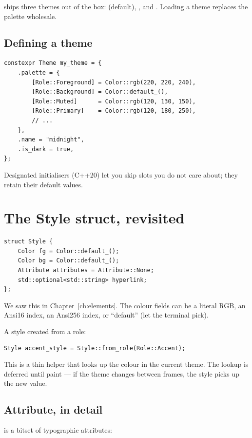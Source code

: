 \maya{} ships three themes out of the box:  (default),
, and . Loading a theme replaces
the palette wholesale.

\subsection*{Defining a theme}

\begin{lstlisting}
constexpr Theme my_theme = {
    .palette = {
        [Role::Foreground] = Color::rgb(220, 220, 240),
        [Role::Background] = Color::default_(),
        [Role::Muted]      = Color::rgb(120, 130, 150),
        [Role::Primary]    = Color::rgb(120, 180, 250),
        // ...
    },
    .name = "midnight",
    .is_dark = true,
};
\end{lstlisting}

Designated initialisers (C++20) let you skip slots you do not
care about; they retain their default values.

\section{The Style struct, revisited}

\begin{lstlisting}
struct Style {
    Color fg = Color::default_();
    Color bg = Color::default_();
    Attribute attributes = Attribute::None;
    std::optional<std::string> hyperlink;
};
\end{lstlisting}

We saw this in Chapter~\ref{ch:elements}. The colour fields can
be a literal RGB, an Ansi16 index, an Ansi256 index, or
``default'' (let the terminal pick).

A style created from a role:

\begin{lstlisting}
Style accent_style = Style::from_role(Role::Accent);
\end{lstlisting}

This is a thin helper that looks up the colour in the current
theme. The lookup is deferred until paint --- if the theme
changes between frames, the style picks up the new value.

\subsection*{Attribute, in detail}

 is a bitset of typographic attributes:

